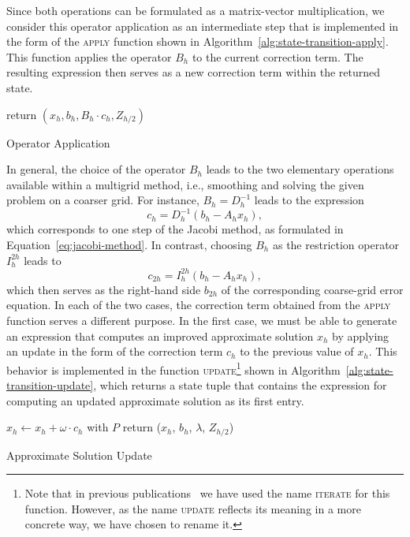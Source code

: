 Since both operations can be formulated as a matrix-vector multiplication, we consider this operator application as an intermediate step that is implemented in the form of the \textsc{apply} function shown in Algorithm~\ref{alg:state-transition-apply}.
This function applies the operator $B_h$ to the current correction term. 
The resulting expression then serves as a new correction term within the returned state.
\begin{algorithm}[h]
	\begin{algorithmic}
		\State return $(x_h, b_h, B_h\cdot c_h, Z_{h/2})$
		\EndFunction
	\end{algorithmic}
\caption{Operator Application}
\label{alg:state-transition-apply}
\end{algorithm}
In general, the choice of the operator $B_h$ leads to the two elementary operations available within a multigrid method, i.e., smoothing and solving the given problem on a coarser grid.
For instance, $B_h = D_h^{-1}$ leads to the expression
\begin{equation*}
	c_h = D_h^{-1} (b_h - A_h x_h),
\end{equation*}
which corresponds to one step of the Jacobi method, as formulated in Equation~\eqref{eq:jacobi-method}.
In contrast, choosing $B_h$ as the restriction operator $I_h^{2h}$ leads to
\begin{equation*}
	c_{2h} = I_{h}^{2h} (b_h - A_h x_h),
\end{equation*}
which then serves as the right-hand side $b_{2h}$ of the corresponding coarse-grid error equation.
In each of the two cases, the correction term obtained from the \textsc{apply} function serves a different purpose.
In the first case, we must be able to generate an expression that computes an improved approximate solution $x_h$ by applying an update in the form of the correction term $c_h$ to the previous value of $x_h$. 
This behavior is implemented in the function \textsc{update}\footnote{Note that in previous publications~\cite{schmitt2020constructing,schmitt2021evostencils} we have used the name \textsc{iterate} for this function. However, as the name \textsc{update} reflects its meaning in a more concrete way, we have chosen to rename it.} shown in Algorithm~\ref{alg:state-transition-update}, which returns a state tuple that contains the expression for computing an updated approximate solution as its first entry.
\begin{algorithm}[t]
	\begin{algorithmic}
		\Function{update}{$\omega$, $P$, ($x_h$, $b_h$, $c_h$, $Z_{h/2}$)}
			\State $x_h \gets x_h + \omega \cdot c_h$ with $P$
			\State return ($x_h$, $b_h$, $\lambda$, $Z_{h/2}$) 
		\EndFunction
	\end{algorithmic}
 \caption{Approximate Solution Update}
\label{alg:state-transition-update}
\end{algorithm}
